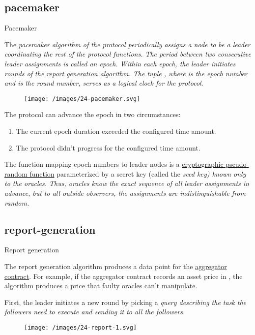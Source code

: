 \documentclass{article}
\begin{document}
\subsection{pacemaker}{Pacemaker}

The \em{pacemaker} algorithm of the  protocol periodically assigns a node to be a \em{leader} coordinating the rest of the protocol functions.
The period between two consecutive leader assignments is called an \em{epoch}.
Within each epoch, the leader initiates \em{rounds} of the \href{#report-generation}{report generation} algorithm.
The tuple , where  is the epoch number and  is the round number, serves as a logical clock for the protocol.

\begin{figure}[grayscale-diagram]
    \texttt{[image: /images/24-pacemaker.svg]}
\end{figure}

The protocol can advance the epoch in two circumstances:
\begin{enumerate}
    \item The current epoch duration exceeded the configured time amount.
    \item The protocol didn't progress for the configured time amount.
\end{enumerate}

The function mapping epoch numbers to leader nodes is a \href{https://crypto.stanford.edu/pbc/notes/crypto/prf.html}{cryptographic pseudo-random function} parameterized by a secret key (called the \em{seed} key) known only to the oracles.
Thus, oracles know the exact sequence of all leader assignments in advance, but to all outside observers, the assignments are indistinguishable from random.

\subsection{report-generation}{Report generation}

The report generation algorithm produces a data point for the \href{#aggregator-contract}{aggregator contract}.
For example, if the aggregator contract records an asset price in , the algorithm produces a price that faulty oracles can't manipulate.

First, the leader initiates a new round by picking a \em{query} describing the task the followers need to execute and sending it to all the followers.
\begin{figure}[grayscale-diagram,medium-size]
\texttt{[image: /images/24-report-1.svg]}
\end{figure}
\end{document}
